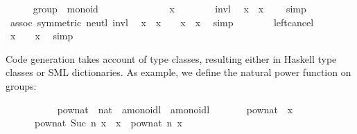 \begin{isabellebody}
\begin{isamarkuptext}
\end{isamarkuptext}%
\isamarkuptrue%
\ \ \ \ \isamarkupfalse%
\ group\ {\isacharless}\ monoid\isanewline
%
\isadelimproof
\ \ \ \ %
\endisadelimproof
%
\isatagproof
{}\isamarkupfalse%
\ {\isacharminus}\isanewline
\ \ \ \ \ \ \isamarkupfalse%
\ x\isanewline
\ \ \ \ \ \ \isamarkupfalse%
\ invl\ \isamarkupfalse%
\ {\isachardoublequoteopen}x\isactrlloc {\isasymdiv}\ \isactrlloc {\isasymotimes}\ x\ {\isacharequal}\ \isactrlloc {\isasymone}{\isachardoublequoteclose}\ \isamarkupfalse%
\ simp\isanewline
\ \ \ \ \ \ \isamarkupfalse%
\ assoc\ {\isacharbrackleft}symmetric{\isacharbrackright}\ neutl\ invl\ \isamarkupfalse%
\ {\isachardoublequoteopen}x\isactrlloc {\isasymdiv}\ \isactrlloc {\isasymotimes}\ {\isacharparenleft}x\ \isactrlloc {\isasymotimes}\ \isactrlloc {\isasymone}{\isacharparenright}\ {\isacharequal}\ x\isactrlloc {\isasymdiv}\ \isactrlloc {\isasymotimes}\ x{\isachardoublequoteclose}\ \isamarkupfalse%
\ simp\isanewline
\ \ \ \ \ \ \isamarkupfalse%
\ left{\isacharunderscore}cancel\ \isamarkupfalse%
\ {\isachardoublequoteopen}x\ \isactrlloc {\isasymotimes}\ \isactrlloc {\isasymone}\ {\isacharequal}\ x{\isachardoublequoteclose}\ \isamarkupfalse%
\ simp\isanewline
\ \ \ \ \isamarkupfalse%
%
\endisatagproof
{\isafoldproof}%
%
\isadelimproof
%
\endisadelimproof
%
\isamarkuptrue%
%
\begin{isamarkuptext}%
Code generation takes account of type classes,
  resulting either in Haskell type classes or SML dictionaries.
  As example, we define the natural power function on groups:%
\end{isamarkuptext}%
\isamarkuptrue%
\ \ \ \ \isamarkupfalse%
\isanewline
\ \ \ \ \ \ pow{\isacharunderscore}nat\ {\isacharcolon}{\isacharcolon}\ {\isachardoublequoteopen}nat\ {\isasymRightarrow}\ {\isacharprime}a{\isasymColon}monoidl\ {\isasymRightarrow}\ {\isacharprime}a{\isasymColon}monoidl{\isachardoublequoteclose}\ \isanewline
\ \ \ \ \ \ {\isachardoublequoteopen}pow{\isacharunderscore}nat\ {}\ x\ {\isacharequal}\ {\isasymone}{\isachardoublequoteclose}\isanewline
\ \ \ \ \ \ {\isachardoublequoteopen}pow{\isacharunderscore}nat\ {\isacharparenleft}Suc\ n{\isacharparenright}\ x\ {\isacharequal}\ x\ {\isasymotimes}\ pow{\isacharunderscore}nat\ n\ x{\isachardoublequoteclose}\isanewline

\end{isabellebody}
